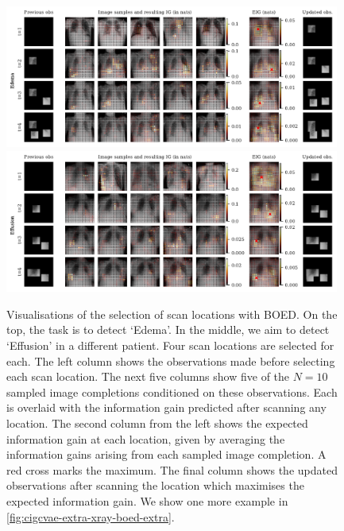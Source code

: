 \begin{figure}[t]
  \centering
  \includegraphics[width=0.98\textwidth]{figs/cigcvae/boed-visualisation-4960-compressed.pdf}
  \includegraphics[width=0.98\textwidth]{figs/cigcvae/boed-visualisation-4970-compressed.pdf}
  \caption{Visualisations of the selection of scan locations with BOED. On the top, the task is to detect
    `Edema'. In the middle, we aim to detect `Effusion' in a different patient.
    Four scan locations are
    selected for each. The left column shows the observations made before
    selecting each scan location. The next five columns show five of the $N=10$
    sampled image completions conditioned on these observations. Each is
    overlaid with the information gain predicted after scanning any location.
    The second column from the left shows the expected information gain at each
    location, given by averaging the information gains arising from each sampled
    image completion. A red cross marks the maximum. The final column shows the
    updated observations after scanning the location which maximises the
    expected information gain. We show one more example in \cref{fig:cigcvae-extra-xray-boed-extra}.}
  \label{fig:cigcvae-extra-xray-boed}
\end{figure}


